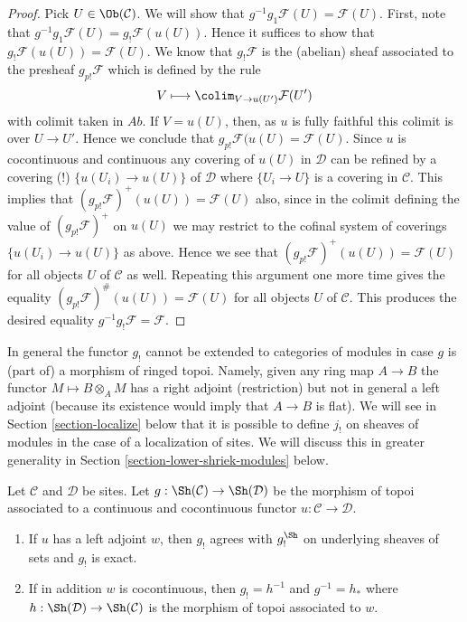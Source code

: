 \begin{proof}
Pick $U \in \Ob(\mathcal{C})$. We will show that
$g^{-1}g_1\mathcal{F}(U) = \mathcal{F}(U)$. First, note that
$g^{-1}g_1\mathcal{F}(U) = g_!\mathcal{F}(u(U))$. Hence it suffices
to show that $g_!\mathcal{F}(u(U)) = \mathcal{F}(U)$.
We know that $g_{!}\mathcal{F}$ is the (abelian) sheaf associated
to the presheaf $g_{p!}\mathcal{F}$ which is defined by the rule
$$
V \longmapsto \colim_{V \to u(U')} \mathcal{F}(U')
$$
with colimit taken in $\textit{Ab}$. If $V = u(U)$, then, as $u$ is
fully faithful this colimit is over $U \to U'$. Hence we conclude
that $g_{p!}\mathcal{F}(u(U) = \mathcal{F}(U)$.
Since $u$ is cocontinuous and continuous any covering of $u(U)$ in
$\mathcal{D}$ can be refined by a covering (!) $\{u(U_i) \to u(U)\}$
of $\mathcal{D}$ where $\{U_i \to U\}$ is a covering in $\mathcal{C}$.
This implies that $(g_{p!}\mathcal{F})^+(u(U)) = \mathcal{F}(U)$ also,
since in the colimit defining the value of $(g_{p!}\mathcal{F})^+$
on $u(U)$ we may restrict to the cofinal system of coverings
$\{u(U_i) \to u(U)\}$ as above. Hence we see that
$(g_{p!}\mathcal{F})^+(u(U)) = \mathcal{F}(U)$ for all objects $U$
of $\mathcal{C}$ as well. Repeating this argument one more time
gives the equality $(g_{p!}\mathcal{F})^\#(u(U)) = \mathcal{F}(U)$
for all objects $U$ of $\mathcal{C}$. This produces the desired
equality $g^{-1}g_!\mathcal{F} = \mathcal{F}$.
\end{proof}

\begin{remark}
\label{remark-no-extension}
In general the functor $g_!$ cannot be extended to categories of modules
in case $g$ is (part of) a morphism of ringed topoi. Namely, given any
ring map $A \to B$ the functor $M \mapsto B \otimes_A M$ has a right adjoint
(restriction) but not in general a left adjoint (because its existence
would imply that $A \to B$ is flat). We will see in
Section \ref{section-localize}
below that it is possible to define $j_!$ on sheaves of modules
in the case of a localization of sites.
We will discuss this in greater generality in
Section \ref{section-lower-shriek-modules} below.
\end{remark}

\begin{lemma}
\label{lemma-have-left-adjoint}
Let $\mathcal{C}$ and $\mathcal{D}$ be sites. Let
$g : \Sh(\mathcal{C}) \to \Sh(\mathcal{D})$ be the morphism of topoi
associated to a continuous and cocontinuous functor
$u : \mathcal{C} \to \mathcal{D}$.
\begin{enumerate}
\item If $u$ has a left adjoint $w$, then $g_!$ agrees with $g_!^{\Sh}$
on underlying sheaves of sets and $g_!$ is exact.
\item If in addition $w$ is cocontinuous, then $g_! = h^{-1}$ and
$g^{-1} = h_*$ where
$h : \Sh(\mathcal{D}) \to \Sh(\mathcal{C})$ is the morphism of topoi
associated to $w$.
\end{enumerate}
\end{lemma}

